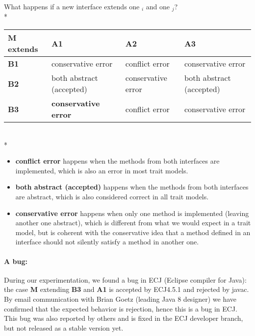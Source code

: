 \noindent
What happens if a new interface \Q@M@ extends one \Q@A@${}_i$ and one
\Q@B@${}_j$?\\*
\noindent
\begin{tabular}{|l|l|l|l|}
\hline
\textbf{M extends} & \textbf{A1}                  & \textbf{A2} & \textbf{A3} \\ \hline
\textbf{B1}        & conservative error                     & conflict error      & conservative error       \\ \hline
\textbf{B2}        & both abstract (accepted)     & conservative error       & both abstract (accepted)       \\ \hline
\textbf{B3}        & \textbf{conservative error} &conflict  error       & conservative error      \\ \hline
\end{tabular}
\\*
\begin{itemize}
\item \textbf{conflict error} happens when the methods from both interfaces are implemented, which is also an error in most trait models.
\item \textbf{both abstract (accepted)} happens when the methods from both interfaces are abstract, which is also considered correct in all
  trait models.
\item \textbf{conservative error} happens when only one method is implemented
  (leaving another one abstract), which is different from what we would expect in
  a trait model, but is coherent with the conservative idea that a method
  defined in an interface should not silently satisfy a method in another one.
\end{itemize}

\paragraph{A bug:} During our experimentation, we found a bug in ECJ (Eclipse compiler for Java):
the case \textbf{M} extending \textbf{B3} and \textbf{A1} is accepted by
ECJ4.5.1 and rejected by javac.  By email communication with Brian Goetz
(leading Java 8 designer) we have confirmed that the expected behavior is
rejection, hence this is a bug in ECJ. This bug was also reported by
  others and is fixed in the ECJ developer branch, but not released as a stable
  version yet.

